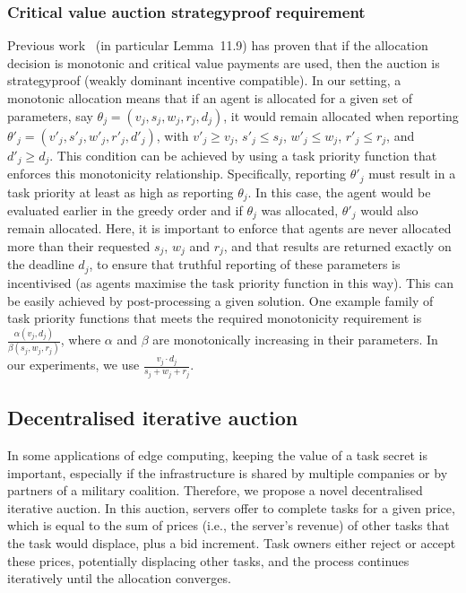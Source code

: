 \subsubsection{Critical value auction strategyproof requirement}
\label{subsubsec:critical-value-auction-strategyproof}
Previous work~\cite{nisan2007algorithmic} (in particular Lemma~11.9) has proven that if the allocation decision is monotonic and critical value payments are used, then the auction is strategyproof (weakly dominant incentive compatible). In our setting, a monotonic allocation means that if an agent is allocated for a given set of parameters, say $\theta_j = (v_j, s_j, w_j, r_j, d_j)$, it would remain allocated when  reporting $\theta'_j = (v'_j, s'_j, w'_j, r'_j, d'_j) $, with $v'_j \geq v_j$, $s'_j \leq s_j$, $w'_j \leq w_j$, $r'_j \leq r_j$, and $d'_j \geq d_j$. This condition can be achieved by using a task priority function that enforces this monotonicity relationship. Specifically, reporting $\theta'_j$ must result in a task priority at least as high as reporting $\theta_j$. In this case, the agent would be evaluated earlier in the greedy order and if $\theta_j$ was allocated, $\theta'_j$ would also remain allocated. Here, it is important to enforce that agents are never allocated more than their requested $s_j$, $w_j$ and $r_j$, and that results are returned exactly on the deadline $d_j$, to ensure that truthful reporting of these parameters is incentivised (as agents maximise the task priority function in this way). This can be easily achieved by post-processing a given solution. One example family of task priority functions that meets the required monotonicity requirement is $\frac{\alpha(v_j, d_j)}{\beta(s_j, w_j, r_j)}$, where  $\alpha$ and $\beta$ are monotonically increasing in their parameters. In our experiments, we use $\frac{v_j \cdot d_j}{s_j + w_j + r_j}$.

\subsection{Decentralised iterative auction}
\label{subsec:decentralised-iterative-auction}
In some applications of edge computing, keeping the value of a task secret is important, especially if the infrastructure is shared by multiple companies or by partners of a military coalition. Therefore, we propose a novel decentralised iterative auction. In this auction, servers offer to complete tasks for a given price, which is equal to the sum of prices (i.e., the server's revenue) of other tasks that the task would displace, plus a bid increment. Task owners either reject or accept these prices, potentially displacing other tasks, and the process continues iteratively until the allocation converges.

